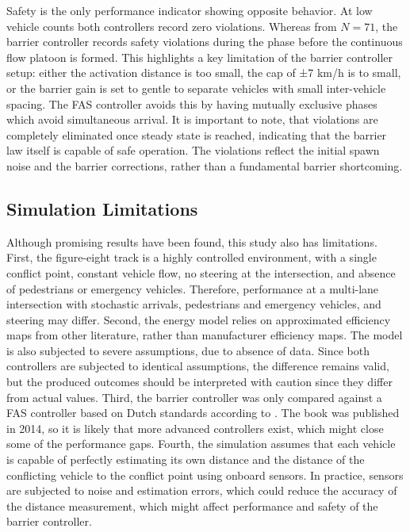 Safety is the only performance indicator showing opposite behavior. At low vehicle counts both controllers record zero violations. Whereas from \(N=71\), the barrier controller records safety violations during the phase before the continuous flow platoon is formed. This highlights a key limitation of the barrier controller setup: either the activation distance is too small, the cap of ±7 km/h is to small, or the barrier gain is set to gentle to separate vehicles with small inter-vehicle spacing. The FAS controller avoids this by having mutually exclusive phases which avoid simultaneous arrival. It is important to note, that violations are completely eliminated once steady state is reached, indicating that the barrier law itself is capable of safe operation. The violations reflect the initial spawn noise and the barrier corrections, rather than a fundamental barrier shortcoming.


\subsection{Simulation Limitations}
Although promising results have been found, this study also has limitations. First, the figure-eight track is a highly controlled environment, with a single conflict point, constant vehicle flow, no steering at the intersection, and absence of pedestrians or emergency vehicles. Therefore, performance at a multi-lane intersection with stochastic arrivals, pedestrians and emergency vehicles, and steering may differ. Second, the energy model relies on approximated efficiency maps from other literature, rather than manufacturer efficiency maps. The model is also subjected to severe assumptions, due to absence of data. Since both controllers are subjected to identical assumptions, the difference remains valid, but the produced outcomes should be interpreted with caution since they differ from actual values. Third, the barrier controller was only compared against a FAS controller based on Dutch standards according to \textcite{wilson2014handboek}. The book was published in 2014, so it is likely that more advanced controllers exist, which might close some of the performance gaps. Fourth, the simulation assumes that each vehicle is capable of perfectly estimating its own distance and the distance of the conflicting vehicle to the conflict point using onboard sensors. In practice, sensors are subjected to noise and estimation errors, which could reduce the accuracy of the distance measurement, which might affect performance and safety of the barrier controller.
